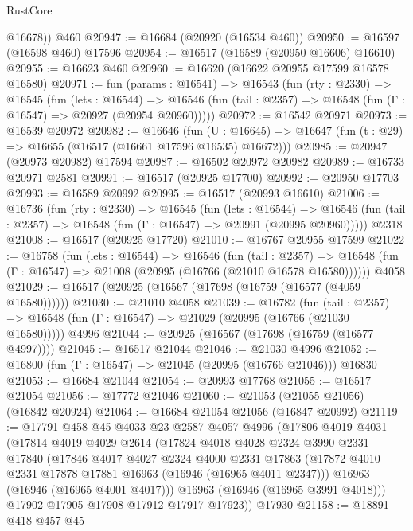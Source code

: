 \begin{lexlean}{RustCore}
\begin{coremodule}
        @16678))
    @460
@20947 := @16684 (@20920 (@16534 @460))
@20950 := @16597 (@16598 @460) @17596
@20954 := @16517 (@16589 (@20950 @16606) @16610)
@20955 := @16623 @460
@20960 := @16620 (@16622 @20955 @17599 @16578 @16580)
@20971 := fun (params : @16541) =>
  @16543
    (fun (rty : @2330) =>
    @16545
      (fun (lets : @16544) =>
      @16546 (fun (tail : @2357) => @16548 (fun (Γ : @16547) => @20927 (@20954 @20960)))))
@20972 := @16542 @20971
@20973 := @16539 @20972
@20982 := @16646
    (fun (U : @16645) => @16647 (fun (t : @29) => @16655 (@16517 (@16661 @17596 @16535) @16672)))
@20985 := @20947 (@20973 @20982) @17594
@20987 := @16502 @20972 @20982
@20989 := @16733 @20971 @2581
@20991 := @16517 (@20925 @17700)
@20992 := @20950 @17703
@20993 := @16589 @20992
@20995 := @16517 (@20993 @16610)
@21006 := @16736
    (fun (rty : @2330) =>
    @16545
      (fun (lets : @16544) =>
      @16546 (fun (tail : @2357) => @16548 (fun (Γ : @16547) => @20991 (@20995 @20960)))))
    @2318
@21008 := @16517 (@20925 @17720)
@21010 := @16767 @20955 @17599
@21022 := @16758
    (fun (lets : @16544) =>
    @16546
      (fun (tail : @2357) =>
      @16548 (fun (Γ : @16547) => @21008 (@20995 (@16766 (@21010 @16578 @16580))))))
    @4058
@21029 := @16517 (@20925 (@16567 (@17698 (@16759 (@16577 (@4059 @16580))))))
@21030 := @21010 @4058
@21039 := @16782
    (fun (tail : @2357) => @16548 (fun (Γ : @16547) => @21029 (@20995 (@16766 (@21030 @16580)))))
    @4996
@21044 := @20925 (@16567 (@17698 (@16759 (@16577 @4997))))
@21045 := @16517 @21044
@21046 := @21030 @4996
@21052 := @16800 (fun (Γ : @16547) => @21045 (@20995 (@16766 @21046))) @16830
@21053 := @16684 @21044
@21054 := @20993 @17768
@21055 := @16517 @21054
@21056 := @17772 @21046
@21060 := @21053 (@21055 @21056) (@16842 @20924)
@21064 := @16684 @21054 @21056 (@16847 @20992)
@21119 := @17791
    @458
    @45
    @4033
    @23
    @2587
    @4057
    @4996
    (@17806
      @4019
      @4031
      (@17814
        @4019
        @4029
        @2614
        (@17824
          @4018
          @4028
          @2324
          @3990
          @2331
          @17840
          (@17846
            @4017
            @4027
            @2324
            @4000
            @2331
            @17863
            (@17872 @4010 @2331 @17878 @17881 @16963 (@16946 (@16965 @4011 @2347)))
            @16963
            (@16946 (@16965 @4001 @4017)))
          @16963
          (@16946 (@16965 @3991 @4018)))
        @17902
        @17905
        @17908
        @17912
        @17917
        @17923))
    @17930
@21158 := @18891
    @418
    @457
    @45

\end{coremodule}
\end{lexlean}
